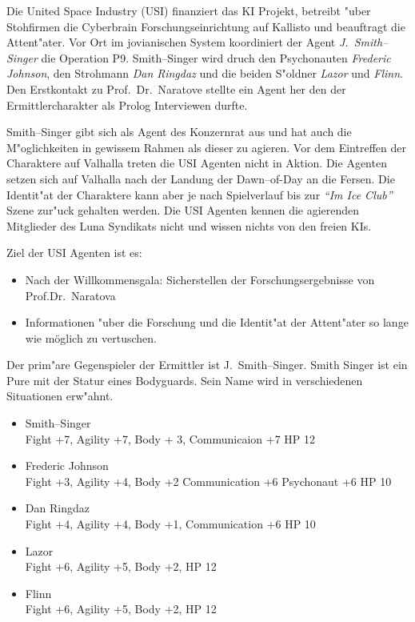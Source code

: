 Die United Space Industry (USI) finanziert das KI Projekt, betreibt "uber Stohfirmen die Cyberbrain Forschungseinrichtung auf Kallisto und beauftragt die Attent"ater. Vor Ort im jovianischen System koordiniert der Agent \emph{J.~Smith--Singer} die Operation P9. Smith--Singer wird druch den Psychonauten \emph{Frederic Johnson}, den Strohmann \emph{Dan Ringdaz} und die beiden S"oldner \emph{Lazor} und \emph{Flinn}. Den Erstkontakt zu Prof.~Dr.~Naratove stellte ein Agent her den der Ermittlercharakter als Prolog Interviewen durfte.

Smith--Singer gibt sich als Agent des Konzernrat aus und hat auch die M"oglichkeiten in gewissem Rahmen als dieser zu agieren. Vor dem Eintreffen der Charaktere auf Valhalla treten die USI Agenten nicht in Aktion. Die Agenten setzen sich auf Valhalla nach der Landung der Dawn--of-Day an die Fersen. Die Identit"at der Charaktere kann aber je nach Spielverlauf bis zur \emph{"`Im Ice Club"'} Szene zur"uck gehalten werden. Die USI Agenten kennen die agierenden Mitglieder des Luna Syndikats nicht und wissen nichts von den freien KIs.

Ziel der USI Agenten ist es:

\begin{itemize}
    \item Nach der Willkommensgala: Sicherstellen der Forschungsergebnisse von Prof.Dr.~Naratova
    \item Informationen "uber die Forschung und die Identit"at der Attent"ater so lange wie möglich zu vertuschen.    
\end{itemize}

Der prim"are Gegenspieler der Ermittler ist J.~Smith--Singer. Smith Singer ist ein Pure mit der Statur eines Bodyguards. Sein Name wird in verschiedenen Situationen erw"ahnt.

\begin{itemize}
    \item Smith--Singer \\
          Fight +7, Agility +7, Body + 3, Communicaion +7 HP 12
    \item Frederic Johnson\\
          Fight +3, Agility +4, Body +2 Communication +6 Psychonaut +6 HP 10
    \item Dan Ringdaz\\
          Fight +4, Agility +4, Body +1, Communication +6 HP 10
    \item Lazor\\
          Fight +6, Agility +5,  Body +2, HP 12
    \item Flinn\\
          Fight +6, Agility +5,  Body +2, HP 12
\end{itemize}